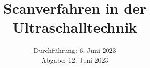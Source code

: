 

\subject{\texorpdfstring{\vspace{2ex}}{}US1\texorpdfstring{\vspace{-2ex}}{}} %
\title{Scanverfahren in der Ultraschalltechnik} %
\date{
	Durchführung: 6. Juni 2023 %
	\\ Abgabe: 12. Juni 2023 %
}




\maketitle
\thispagestyle{empty}


\tableofcontents
\newpage







\printbibliography{}

\newpage



